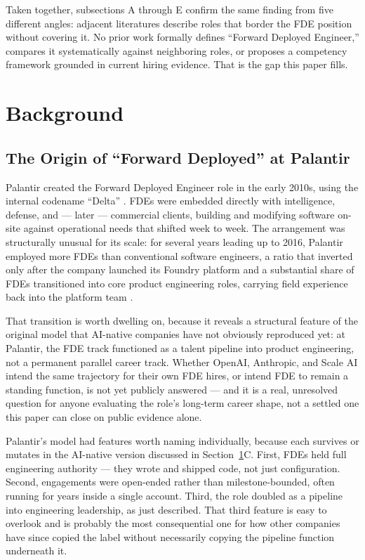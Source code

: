 \documentclass[journal]{IEEEtran}
\begin{document}
Taken together, subsections A through E confirm the same finding from five different angles: adjacent literatures describe roles that border the FDE position without covering it. No prior work formally defines ``Forward Deployed Engineer,'' compares it systematically against neighboring roles, or proposes a competency framework grounded in current hiring evidence. That is the gap this paper fills.

\section{Background}
\label{sec:background}

\subsection{The Origin of ``Forward Deployed'' at Palantir}

Palantir created the Forward Deployed Engineer role in the early 2010s, using the internal codename ``Delta'' \cite{orosz2025fde}. FDEs were embedded directly with intelligence, defense, and --- later --- commercial clients, building and modifying software on-site against operational needs that shifted week to week. The arrangement was structurally unusual for its scale: for several years leading up to 2016, Palantir employed more FDEs than conventional software engineers, a ratio that inverted only after the company launched its Foundry platform and a substantial share of FDEs transitioned into core product engineering roles, carrying field experience back into the platform team \cite{orosz2025fde}.

That transition is worth dwelling on, because it reveals a structural feature of the original model that AI-native companies have not obviously reproduced yet: at Palantir, the FDE track functioned as a talent pipeline into product engineering, not a permanent parallel career track. Whether OpenAI, Anthropic, and Scale AI intend the same trajectory for their own FDE hires, or intend FDE to remain a standing function, is not yet publicly answered --- and it is a real, unresolved question for anyone evaluating the role's long-term career shape, not a settled one this paper can close on public evidence alone.

Palantir's model had features worth naming individually, because each survives or mutates in the AI-native version discussed in Section~\ref{sec:background}C. First, FDEs held full engineering authority --- they wrote and shipped code, not just configuration. Second, engagements were open-ended rather than milestone-bounded, often running for years inside a single account. Third, the role doubled as a pipeline into engineering leadership, as just described. That third feature is easy to overlook and is probably the most consequential one for how other companies have since copied the label without necessarily copying the pipeline function underneath it.
\end{document}
